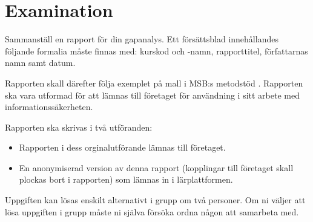\documentclass[a4paper]{article}
\begin{document}
\section{Examination}

Sammanställ en rapport för din gapanalys.
Ett försättsblad innehållandes följande formalia måste finnas med:
kurskod och -namn, rapporttitel, författarnas namn samt datum.

Rapporten skall därefter följa exemplet på mall i MSB:s metodstöd \citep[bilaga 
C]{MSB2011gap}.
Rapporten ska vara utformad för att lämnas till företaget för användning i sitt
arbete med informationssäkerheten.

Rapporten ska skrivas i två utföranden:
\begin{itemize}
  \item Rapporten i dess orginalutförande lämnas till företaget.
  \item En anonymiserad version av denna rapport (kopplingar till företaget
    skall plockas bort i rapporten) som lämnas in i lärplattformen.
\end{itemize}



Uppgiften kan lösas enskilt alternativt i grupp om två personer.
Om ni väljer att lösa uppgiften i grupp måste ni själva försöka ordna någon
att samarbeta med.


\printbibliography{}
\end{document}
